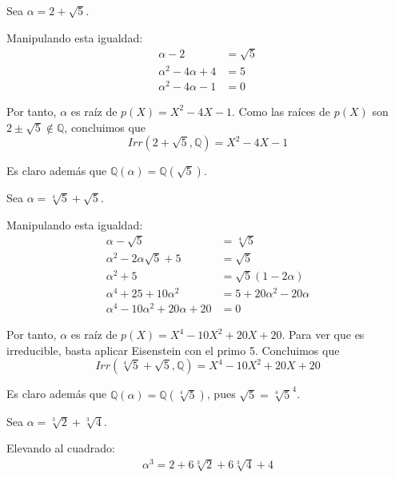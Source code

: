 \documentclass[a4paper, 11pt]{article}
\begin{document}
  \begin{solucion}
      \begin{apartado}
          Sea $\alpha = 2 + \sqrt{5}$.

          Manipulando esta igualdad:
          \begin{align*}
              \alpha - 2 &= \sqrt{5} \\
              \alpha^2 - 4\alpha + 4 &= 5 \\
              \alpha^2 - 4\alpha - 1 &= 0
          \end{align*}

          Por tanto, $\alpha$ es raíz de $p(X) = X^2 -4X -1$. Como las raíces de $p(X)$ son $2 \pm \sqrt{5}\notin\mathbb{Q}$, concluimos que
          \[
          Irr(2 + \sqrt{5}, \mathbb{Q}) = X^2 - 4X - 1
          \]

          Es claro además que $\mathbb{Q}(\alpha) = \mathbb{Q}(\sqrt{5})$.
      \end{apartado}

      \begin{apartado}
          Sea $\alpha = \sqrt[4]{5} + \sqrt{5}$.

          Manipulando esta igualdad:
          \begin{align*}
              \alpha - \sqrt{5} &= \sqrt[4]{5} \\
              \alpha^2 - 2\alpha\sqrt{5} + 5 &= \sqrt{5} \\
              \alpha^2 + 5 &= \sqrt{5}(1-2\alpha) \\
              \alpha^4 + 25 + 10\alpha^2 &= 5+20\alpha^2-20\alpha \\
              \alpha^4 - 10\alpha^2 + 20\alpha + 20 &= 0
          \end{align*}

          Por tanto, $\alpha$ es raíz de $p(X) = X^4 - 10X^2 + 20X + 20$. Para ver que es irreducible, basta aplicar Eisenstein con el primo 5. Concluimos que
          \[
          Irr(\sqrt[4]{5} + \sqrt{5}, \mathbb{Q}) = X^4 - 10X^2 + 20X + 20
          \]

          Es claro además que $\mathbb{Q}(\alpha) = \mathbb{Q}(\sqrt[4]{5})$, pues $\sqrt{5} = \sqrt[4]{5}^4$.
      \end{apartado}

      \begin{apartado}
          Sea $\alpha = \sqrt[3]{2} + \sqrt[3]{4}$.

          Elevando al cuadrado:
          \begin{align*}
              \alpha^3 = 2 + 6\sqrt[3]{2} + 6\sqrt[3]{4} + 4
          \end{align*}


\end{apartado}
\end{solucion}
\end{document}
